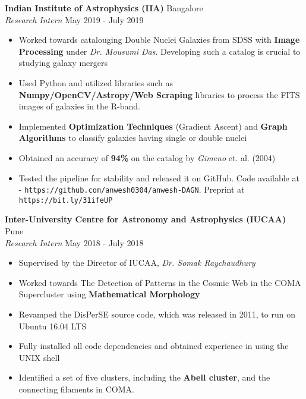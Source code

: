 \documentclass[a4paper]{article}
\begin{document}
\textbf{Indian Institute of Astrophysics (IIA)} \hfill Bangalore\\
\textit{Research Intern} \hfill May 2019 - July 2019\\
\vspace{-1mm}
\begin{itemize} \itemsep 1pt
	\item Worked towards catalouging Double Nuclei Galaxies from SDSS with \textbf{Image Processing} under \textit{Dr. Mousumi Das}. Developing such a catalog is crucial to studying galaxy mergers
	\item Used Python and utilized libraries such as \textbf{Numpy/OpenCV/Astropy/Web Scraping} libraries to process the FITS images of galaxies in the R-band.
	\item Implemented \textbf{Optimization Techniques} (Gradient Ascent) and \textbf{Graph Algorithms} to classify galaxies having single or double nuclei
	\item Obtained an accuracy of \textbf{94\%} on the catalog by \textit{Gimeno} et. al. (2004)
	\item Tested the pipeline for stability and released it on GitHub. Code available at - \texttt{https://github.com/anwesh0304/anwesh-DAGN}. Preprint at \texttt{https://bit.ly/31ifeUP}
\end{itemize}

\textbf{Inter-University Centre for Astronomy and Astrophysics (IUCAA)} \hfill Pune\\
\textit{Research Intern} \hfill May 2018 - July 2018\\
\vspace{-1mm}
\begin{itemize} \itemsep 1pt
	\item Supervised by the Director of IUCAA, \textit{Dr. Somak Raychaudhury}
	\item Worked towards The Detection of Patterns in the Cosmic Web in the COMA Supercluster using \textbf{Mathematical Morphology}
	\item Revamped the DisPerSE source code, which was released in 2011, to run on Ubuntu 16.04 LTS
	\item Fully installed all code dependencies and obtained experience in using the UNIX shell
	\item Identified a set of five clusters, including the \textbf{Abell cluster}, and the connecting filaments in COMA.
\end{itemize}
\end{document}
